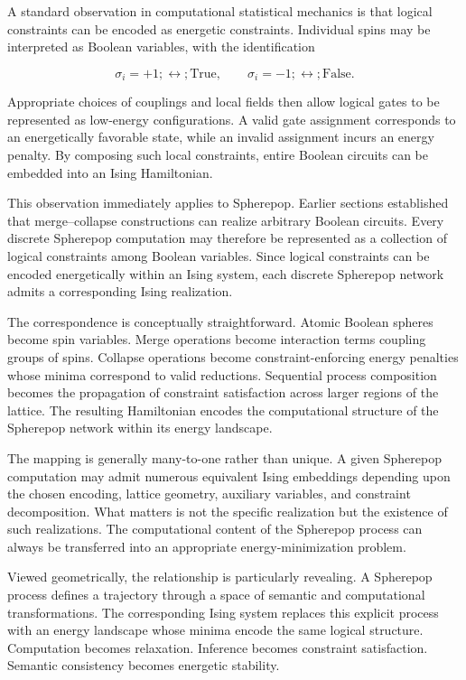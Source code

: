\documentclass[12pt,letterpaper]{article}
\theoremstyle{remark}
\begin{document}
A standard observation in computational statistical mechanics is that logical constraints can be encoded as energetic constraints. Individual spins may be interpreted as Boolean variables, with the identification

\[
\sigma_i = +1
;\leftrightarrow;
\text{True},
\qquad
\sigma_i = -1
;\leftrightarrow;
\text{False}.
\]

Appropriate choices of couplings and local fields then allow logical gates to be represented as low-energy configurations. A valid gate assignment corresponds to an energetically favorable state, while an invalid assignment incurs an energy penalty. By composing such local constraints, entire Boolean circuits can be embedded into an Ising Hamiltonian.

This observation immediately applies to Spherepop. Earlier sections established that merge--collapse constructions can realize arbitrary Boolean circuits. Every discrete Spherepop computation may therefore be represented as a collection of logical constraints among Boolean variables. Since logical constraints can be encoded energetically within an Ising system, each discrete Spherepop network admits a corresponding Ising realization.

The correspondence is conceptually straightforward. Atomic Boolean spheres become spin variables. Merge operations become interaction terms coupling groups of spins. Collapse operations become constraint-enforcing energy penalties whose minima correspond to valid reductions. Sequential process composition becomes the propagation of constraint satisfaction across larger regions of the lattice. The resulting Hamiltonian encodes the computational structure of the Spherepop network within its energy landscape.

The mapping is generally many-to-one rather than unique. A given Spherepop computation may admit numerous equivalent Ising embeddings depending upon the chosen encoding, lattice geometry, auxiliary variables, and constraint decomposition. What matters is not the specific realization but the existence of such realizations. The computational content of the Spherepop process can always be transferred into an appropriate energy-minimization problem.

Viewed geometrically, the relationship is particularly revealing. A Spherepop process defines a trajectory through a space of semantic and computational transformations. The corresponding Ising system replaces this explicit process with an energy landscape whose minima encode the same logical structure. Computation becomes relaxation. Inference becomes constraint satisfaction. Semantic consistency becomes energetic stability.
\end{document}
